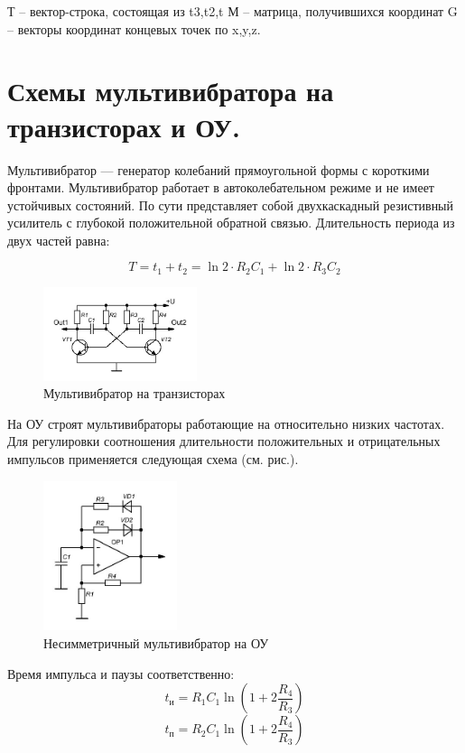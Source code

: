 \documentclass[unicode, 12pt, a4paper, oneside]{article}
\begin{document}
Т – вектор-строка, состоящая из t3,t2,t
	М – матрица, получившихся координат
	G – векторы координат концевых точек по x,y,z.


\section{Схемы мультивибратора на транзисторах и ОУ.}

Мультивибратор — генератор колебаний прямоугольной формы с короткими фронтами. Мультивибратор работает в автоколебательном режиме и не имеет устойчивых состояний. По сути представляет собой двухкаскадный резистивный усилитель с глубокой положительной обратной связью. Длительность периода из двух частей равна:

\begin{displaymath}
T = t_1 + t_2 = \ln 2 \cdot R_2 C_1 + \ln 2 \cdot R_3 C_2
\end{displaymath}
\begin{figure}[H]
\centering
\includegraphics[width=0.4\textwidth]{141_tranz.jpg}
\caption{Мультивибратор на транзисторах}
\end{figure}
На ОУ строят мультивибраторы работающие на относительно низких частотах. Для регулировки соотношения длительности положительных и отрицательных импульсов применяется следующая схема (см. рис.).
\begin{figure}[H]
\centering
\includegraphics[width=0.35\textwidth]{141_OU_unsim.jpg}
\caption{Несимметричный мультивибратор на ОУ}
\end{figure}

Время импульса и паузы соответственно:
\begin{displaymath}
t_\text{и} = R_1 C_1 \ln (1 + 2 \frac{R_4}{R_3} )
\end{displaymath}
\begin{displaymath}
t_\text{п} = R_2 C_1 \ln (1 + 2 \frac{R_4}{R_3} )
\end{displaymath}
\end{document}
